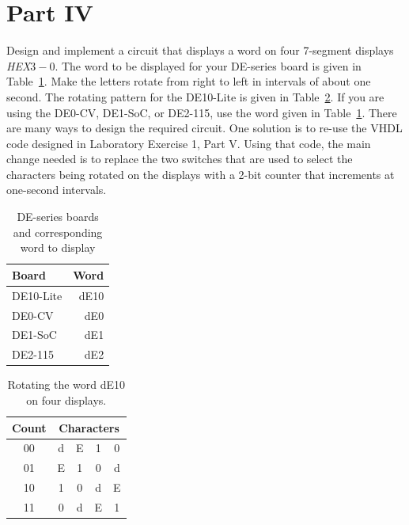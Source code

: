 \documentclass[epsfig,10pt,fullpage]{article}
\begin{document}
\section*{Part IV}
Design and implement a circuit that displays a word on four 7-segment displays {\it HEX}$3-0$.
The word to be displayed for your DE-series board is given in Table~\ref{tab:word}.
Make the letters rotate from right to left in intervals of about one second.
The rotating pattern for the DE10-Lite is given in Table~\ref{tab:rotate}.
If you are using the DE0-CV, DE1-SoC, or DE2-115, use the word given in Table~\ref{tab:word}.
There are many ways to design the required circuit. One solution is to re-use the VHDL code 
designed in Laboratory Exercise 1, Part V. Using that code, the main change needed is to 
replace the two switches that are used to select the characters being rotated on the displays
with a 2-bit counter that increments at one-second intervals.

\begin{table}[H]
\begin{center}
	\begin{tabular}{l | r}
	Board & Word \\
	\hline
	{\rule[0mm]{0mm}{5mm}}DE10-Lite & dE10 \\
	DE0-CV &  dE0 \\
	DE1-SoC &  dE1 \\
	DE2-115 &  dE2 \\
	\end{tabular}
	\caption{DE-series boards and corresponding word to display}
	\label{tab:word}
	\end{center}
\end{table}

\begin{table}[H]
\begin{minipage}[t]{12.5 cm}
\begin{center}
\begin{tabular}{c|cccc}
Count& \multicolumn{4}{c}{Characters} \\
\hline
{\rule[0mm]{0mm}{5mm}00} & d & E & 1 & 0\\ 
01 & E & 1 & 0 & d\\
10 & 1 & 0 & d & E\\
11 & 0 & d & E & 1\\
\end{tabular}
\end{center}
\end{minipage}
\caption{Rotating the word dE10 on four displays.}
\label{tab:rotate}
\end{table}
\end{document}
